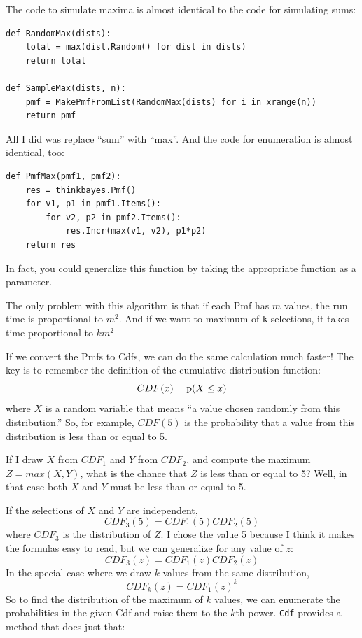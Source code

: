 \documentclass[12pt]{book}
\begin{document}
The code to simulate maxima is almost identical to the code for
simulating sums:

\begin{verbatim}
def RandomMax(dists):
    total = max(dist.Random() for dist in dists)
    return total

def SampleMax(dists, n):
    pmf = MakePmfFromList(RandomMax(dists) for i in xrange(n))
    return pmf
\end{verbatim}

All I did was replace ``sum'' with ``max''.  And the code
for enumeration is almost identical, too:

\begin{verbatim}
def PmfMax(pmf1, pmf2):
    res = thinkbayes.Pmf()
    for v1, p1 in pmf1.Items():
        for v2, p2 in pmf2.Items():
            res.Incr(max(v1, v2), p1*p2)
    return res
\end{verbatim}

In fact, you could generalize this function by taking the
appropriate function as a parameter.

The only problem with this algorithm is that if each Pmf
has $m$ values, the run time is proportional to $m^2$.
And if we want to maximum of {\tt k} selections, it takes
time proportional to $k m^2$

If we convert the Pmfs to Cdfs, we can do the same calculation
much faster!  The key is to remember the definition of the
cumulative distribution function:
%
\[ CDF(x) = \mathrm{p}(X \le x) \]
%
where $X$ is a random variable that means ``a value chosen
randomly from this distribution.''  So, for example, $CDF(5)$
is the probability that a value from this distribution is less
than or equal to 5.

If I draw $X$ from $CDF_1$ and $Y$ from $CDF_2$, and compute
the maximum $Z = max(X, Y)$, what is the chance that $Z$ is
less than or equal to 5?  Well, in that case both $X$ and $Y$
must be less than or equal to 5.

If the selections of $X$ and $Y$ are independent,
%
\[ CDF_3(5) = CDF_1(5) CDF_2(5) \] 
%
where $CDF_3$ is the distribution of $Z$.  I chose the value
5 because I think it makes the formulas easy to read, but we
can generalize for any value of $z$:
%
\[ CDF_3(z) = CDF_1(z) CDF_2(z) \]
%
In the special case where we draw $k$ values from the same
distribution, 
%
\[ CDF_k(z) = CDF_1(z)^k \]
%
So to find the distribution of the maximum of $k$ values,
we can enumerate the probabilities in the given Cdf
and raise them to the $k$th power.
\verb"Cdf" provides a method that does just that:
\end{document}
